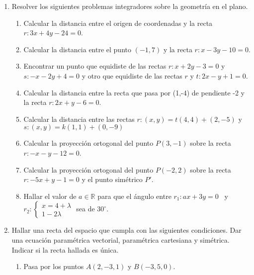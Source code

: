 \documentclass[a4paper]{article}
\newcommand{\exercise}{\item}
\begin{document}
\begin{enumerate}
\begin{multicols}{2}
\begin{enumerate} [label=(\alph*)]
		
	\end{enumerate}
	\end{multicols}

	\exercise Resolver los siguientes problemas integradores sobre la geometría en el plano.
	\begin{enumerate} [label=(\alph*)]
		
		\item Calcular la distancia entre el origen de coordenadas y la recta $r: 3x+4y -24=0$.

		\item Calcular la distancia entre el punto $(-1,7)$ y la recta $r: x-3y -10=0$.

		\item Encontrar un punto que equidiste de las rectas $r: x+2y-3=0$ y $s: -x-2y+4=0$ y otro que equidiste de las rectas $r$ y $t: 2x-y+1=0$.

		\item Calcular la distancia entre la recta que pasa por (1,-4) de pendiente -2 y la recta $r: 2x+y-6=0$.

		\item Calcular la distancia entre las rectas $r: (x,y)=t(4,4)+(2,-5)$ y $s: (x,y)=k(1,1)+(0,-9)$

		\item Calcular la proyección ortogonal del punto $P(3,-1)$ sobre la recta $r: -x-y-12=0$.

		\item Calcular la proyección ortogonal del punto $P(-2,2)$ sobre la recta $r: -5x+y-1=0$ y el punto simétrico $P'$.

		\item Hallar el valor de $a\in\mathbb{R}$ para que el ángulo entre $r_1: ax+3y=0$ ~y~ $r_2:\left\{\begin{matrix} x=4+\lambda \\ 1-2\lambda \end{matrix}\right.$ sea de $30^{\circ}$. 

	\end{enumerate}

	\exercise Hallar una recta del espacio que cumpla con las siguientes condiciones. Dar una ecuación paramétrica vectorial, paramétrica cartesiana y simétrica. Indicar si la recta hallada es única.
	\begin{enumerate} [label=(\alph*)]
		\item Pasa por los puntos $A(2,-3,1)$ y $B(-3,5,0)$.


\end{enumerate}
\end{enumerate}
\end{document}
